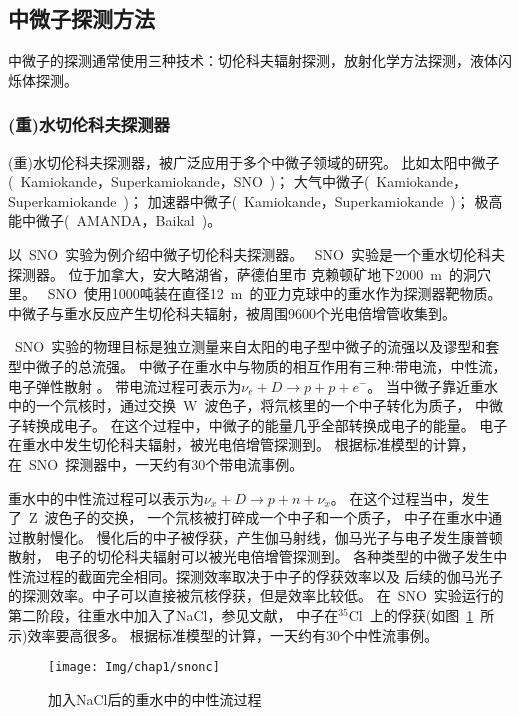 \subsection{中微子探测方法}
中微子的探测通常使用三种技术：切伦科夫辐射探测，放射化学方法探测，液体闪烁体探测。
\subsubsection{(重)水切伦科夫探测器}
(重)水切伦科夫探测器，被广泛应用于多个中微子领域的研究。
比如太阳中微子(~Kamiokande，Superkamiokande，SNO~)；
大气中微子(~Kamiokande，Superkamiokande~)；
加速器中微子(~Kamiokande，Superkamiokande~)；
极高能中微子(~AMANDA\citep{halzen1998amanda}，Baikal\citep{belolaptikov1997baikal}~)。

以~SNO~实验为例介绍中微子切伦科夫探测器。
~SNO~实验是一个重水切伦科夫探测器。
位于加拿大，安大略湖省，萨德伯里市
克赖顿矿地下2000~m~的洞穴里\citep{ewan1992sudbury}。
~SNO~使用1000吨装在直径12~m~的亚力克球中的重水作为探测器靶物质。
中微子与重水反应产生切伦科夫辐射，被周围9600个光电倍增管收集到。

~SNO~实验的物理目标是独立测量来自太阳的电子型中微子的流强以及谬型和套型中微子的总流强。
中微子在重水中与物质的相互作用有三种:带电流，中性流，
电子弹性散射 \citep{ahmad2001measurement,jillings1999electron,ying1992charged}。
带电流过程可表示为$\nu_e+D \rightarrow p + p + e^- $。
当中微子靠近重水中的一个氘核时，通过交换~W~波色子，将氘核里的一个中子转化为质子，
中微子转换成电子。
在这个过程中，中微子的能量几乎全部转换成电子的能量。
电子在重水中发生切伦科夫辐射，被光电倍增管探测到。
根据标准模型的计算，在~SNO~探测器中，一天约有30个带电流事例。

重水中的中性流过程可以表示为$\nu_x + D \rightarrow p + n + \nu_x $。
在这个过程当中，发生了~Z~波色子的交换，
一个氘核被打碎成一个中子和一个质子，
中子在重水中通过散射慢化。
慢化后的中子被俘获，产生伽马射线，伽马光子与电子发生康普顿散射，
电子的切伦科夫辐射可以被光电倍增管探测到。
各种类型的中微子发生中性流过程的截面完全相同。探测效率取决于中子的俘获效率以及
后续的伽马光子的探测效率。中子可以直接被氘核俘获，但是效率比较低。
在~SNO~实验运行的第二阶段，往重水中加入了NaCl，参见文献\citep{ahmed2004measurement}，
中子在$^{35}$Cl~上的俘获(如图~\ref{fig:snonc}~所示)效率要高很多。
根据标准模型的计算，一天约有30个中性流事例。
\begin{figure}[!htb]
  \centering
   \texttt{[image: Img/chap1/snonc]}
    \caption{加入NaCl后的重水中的中性流过程}
  \label{fig:snonc}
\end{figure}

